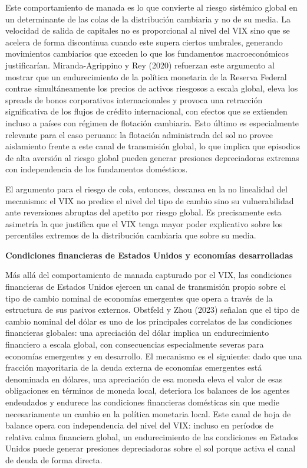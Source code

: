 ﻿\documentclass[11pt,a4paper]{article}
\begin{document}
Este comportamiento de manada es lo que convierte al riesgo sistémico global en un determinante de las colas de la distribución cambiaria y no de su media. La velocidad de salida de capitales no es proporcional al nivel del VIX sino que se acelera de forma discontinua cuando este supera ciertos umbrales, generando movimientos cambiarios que exceden lo que los fundamentos macroeconómicos justificarían. Miranda-Agrippino y Rey (2020) refuerzan este argumento al mostrar que un endurecimiento de la política monetaria de la Reserva Federal contrae simultáneamente los precios de activos riesgosos a escala global, eleva los spreads de bonos corporativos internacionales y provoca una retracción significativa de los flujos de crédito internacional, con efectos que se extienden incluso a países con régimen de flotación cambiaria. Esto último es especialmente relevante para el caso peruano: la flotación administrada del sol no provee aislamiento frente a este canal de transmisión global, lo que implica que episodios de alta aversión al riesgo global pueden generar presiones depreciadoras extremas con independencia de los fundamentos domésticos.

El argumento para el riesgo de cola, entonces, descansa en la no linealidad del mecanismo: el VIX no predice el nivel del tipo de cambio sino su vulnerabilidad ante reversiones abruptas del apetito por riesgo global. Es precisamente esta asimetría la que justifica que el VIX tenga mayor poder explicativo sobre los percentiles extremos de la distribución cambiaria que sobre su media.

\textbf{Condiciones financieras de Estados Unidos y economías desarrolladas}

Más allá del comportamiento de manada capturado por el VIX, las condiciones financieras de Estados Unidos ejercen un canal de transmisión propio sobre el tipo de cambio nominal de economías emergentes que opera a través de la estructura de sus pasivos externos. Obstfeld y Zhou (2023) señalan que el tipo de cambio nominal del dólar es uno de los principales correlatos de las condiciones financieras globales: una apreciación del dólar implica un endurecimiento financiero a escala global, con consecuencias especialmente severas para economías emergentes y en desarrollo. El mecanismo es el siguiente: dado que una fracción mayoritaria de la deuda externa de economías emergentes está denominada en dólares, una apreciación de esa moneda eleva el valor de esas obligaciones en términos de moneda local, deteriora los balances de los agentes endeudados y endurece las condiciones financieras domésticas sin que medie necesariamente un cambio en la política monetaria local. Este canal de hoja de balance opera con independencia del nivel del VIX: incluso en períodos de relativa calma financiera global, un endurecimiento de las condiciones en Estados Unidos puede generar presiones depreciadoras sobre el sol porque activa el canal de deuda de forma directa.
\end{document}
